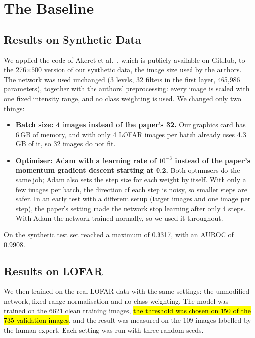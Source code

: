 \chapter{The \tfunet{} Baseline}
\label{ch:tfunet}

\section{Results on Synthetic Data}
We applied the \tfunet{} code of Akeret et al.~\cite{akeret2017}, which is
publicly available on GitHub, to the 276$\times$600 version of our synthetic
data, the image size used by the authors. The network was used unchanged
(3 levels, 32 filters in the first layer, 465{,}986 parameters), together with
the authors' preprocessing: every image is scaled with one fixed intensity
range, and no class weighting is used. We changed only two things:
\begin{itemize}
  \item \textbf{Batch size: 4 images instead of the paper's 32.} Our graphics
    card has 6\,GB of memory, and with only 4 LOFAR images per batch \tfunet{}
    already uses 4.3\,GB of it, so 32 images do not fit.
  \item \textbf{Optimiser: Adam with a learning rate of $10^{-3}$ instead of
    the paper's momentum gradient descent starting at 0.2.} Both optimisers do the
    same job; Adam also sets the step size for each weight by itself. With only
    a few images per batch, the direction of each step is noisy, so smaller
    steps are safer. In an early test with a different setup (larger images and
    one image per step), the paper's setting made the network stop learning
    after only 4 steps. With Adam the network trained normally, so we used it
    throughout.
\end{itemize}
On the synthetic test set
\tfunet{} reached a maximum \Fone{} of 0.9317, with an AUROC of 0.9908.

\section{Results on LOFAR}
\label{sec:tfunet_lofar}
We then trained \tfunet{} on the real LOFAR data with the same settings: the
unmodified network, fixed-range normalisation and no class weighting. The model was trained on the
6621 clean training images, \hl{the threshold was chosen on 150 of the 735
validation images}, and the result was measured on the 109 images labelled by the human
expert. Each setting was run with three random seeds.

